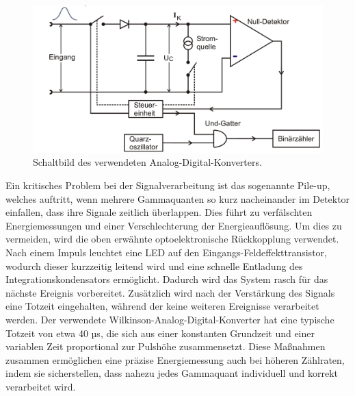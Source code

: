 \begin{figure}[H]
  \centering
  \includegraphics[scale=0.3]{Ressourcen/analogkette.png}
  \caption{Schaltbild des verwendeten Analog-Digital-Konverters.\cite{anleitung}}
  \label{fig:analogkette}
\end{figure}
Ein kritisches Problem bei der Signalverarbeitung ist das sogenannte Pile-up, welches auftritt, wenn mehrere Gammaquanten so kurz nacheinander im Detektor einfallen, dass ihre Signale zeitlich überlappen. Dies führt zu verfälschten Energiemessungen und einer Verschlechterung der Energieauflösung. Um dies zu vermeiden, wird die oben erwähnte optoelektronische Rückkopplung verwendet. Nach einem Impuls leuchtet eine LED auf den Eingangs-Feldeffekttransistor, wodurch dieser kurzzeitig leitend wird und eine schnelle Entladung des Integrationskondensators ermöglicht. Dadurch wird das System rasch für das nächste Ereignis vorbereitet. Zusätzlich wird nach der Verstärkung des Signals eine Totzeit eingehalten, während der keine weiteren Ereignisse verarbeitet werden. Der verwendete Wilkinson-Analog-Digital-Konverter hat eine typische Totzeit von etwa 40 µs, die sich aus einer konstanten Grundzeit und einer variablen Zeit proportional zur Pulshöhe zusammensetzt. Diese Maßnahmen zusammen ermöglichen eine präzise Energiemessung auch bei höheren Zählraten, indem sie sicherstellen, dass nahezu jedes Gammaquant individuell und korrekt verarbeitet wird.
